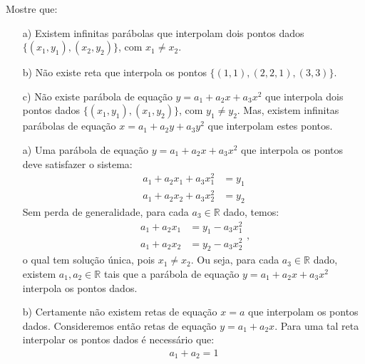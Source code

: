 \begin{Exercise}\label{exer:problemas_mal_determinados}
  Mostre que:
  \begin{itemize}
  \item[a)] Existem infinitas parábolas que interpolam dois pontos dados $\{(x_1, y_1), (x_2, y_2)\}$, com $x_1 \neq x_2$.
  \item[b)] Não existe reta que interpola os pontos $\{(1, 1), (2, 2,1), (3, 3)\}$.
  \item[c)] Não existe parábola de equação $y = a_1 + a_2x + a_3x^2$ que interpola dois pontos dados $\{(x_1, y_1), (x_1, y_2)\}$, com $y_1 \neq y_2$. Mas, existem infinitas parábolas de equação $x = a_1 + a_2y + a_3y^2$ que interpolam estes pontos.
  \end{itemize}
\end{Exercise}
\begin{Answer}
  \begin{tiny}
  \begin{itemize}
  \item[a)] Uma parábola de equação $y = a_1 + a_2x + a_3x^2$ que interpola os pontos deve satisfazer o sistema:
    \begin{equation*}
      \begin{split}
      a_1 + a_2x_1 + a_3x_1^2 &= y_1\\
      a_1 + a_2x_2 + a_3x_2^2 &= y_2        
      \end{split}
    \end{equation*}
Sem perda de generalidade, para cada $a_3\in\mathbb{R}$ dado, temos:
    \begin{equation*}
      \begin{split}
      a_1 + a_2x_1  &= y_1 - a_3x_1^2\\
      a_1 + a_2x_2  &= y_2 - a_3x_2^2       
      \end{split},
    \end{equation*} 
o qual tem solução única, pois $x_1\neq x_2$. Ou seja, para cada $a_3\in\mathbb{R}$ dado, existem $a_1, a_2\in\mathbb{R}$ tais que a parábola de equação $y = a_1 + a_2x + a_3x^2$ interpola os pontos dados.
\item[b)] Certamente não existem retas de equação $x = a$ que interpolam os pontos dados. Consideremos então retas de equação $y = a_1 + a_2x$. Para uma tal reta interpolar os pontos dados é necessário que:
  \begin{equation*}
    \begin{split}
    a_1 + a_2 = 1\\

\end{split}
\end{equation*}
\end{itemize}
\end{tiny}
\end{Answer}
